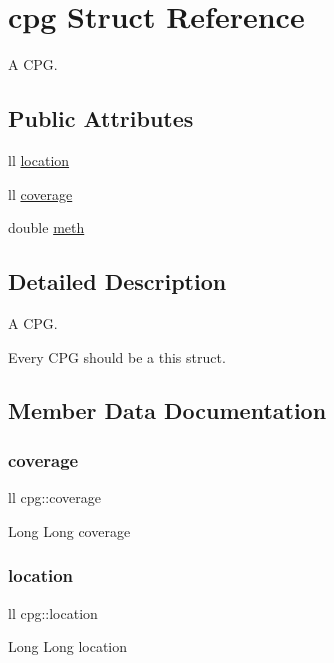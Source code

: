 \hypertarget{structcpg}{}\section{cpg Struct Reference}
\label{structcpg}


A C\+PG.  


\subsection*{Public Attributes}
\begin{DoxyCompactItemize}
\item 
ll \hyperlink{structcpg_af217081e41554d9ab4242e3ef675eca5}{location}
\item 
ll \hyperlink{structcpg_a32c387f9a1be29b207a2e21c9a66b011}{coverage}
\item 
double \hyperlink{structcpg_af765f9b5834f3df1ff0e49dd7f46f909}{meth}
\end{DoxyCompactItemize}


\subsection{Detailed Description}
A C\+PG. 

Every C\+PG should be a this struct. 

\subsection{Member Data Documentation}
\mbox{\label{structcpg_a32c387f9a1be29b207a2e21c9a66b011}} 
\subsubsection{\texorpdfstring{coverage}{coverage}}
{\footnotesize\ttfamily ll cpg\+::coverage}

Long Long coverage \mbox{\label{structcpg_af217081e41554d9ab4242e3ef675eca5}} 
\subsubsection{\texorpdfstring{location}{location}}
{\footnotesize\ttfamily ll cpg\+::location}

Long Long location \mbox{\label{structcpg_af765f9b5834f3df1ff0e49dd7f46f909}} 
